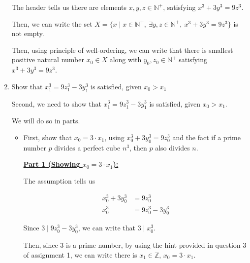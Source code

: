 \documentclass[12pt]{article}
\begin{document}
\begin{mdframed}
\begin{enumerate}[1.]
\begin{mdframed}
        \bigskip

        The header tells us there are elements $x,y,z \in \mathbb{N}^+$, satisfying
        $x^3 + 3y^3 = 9z^3$.

        \bigskip

        Then, we can write the set $X = \{x \mid x \in \mathbb{N}^+,\:\exists y,z \in
        \mathbb{N}^+,\:x^3 + 3y^3 = 9z^3\}$ is not empty.

        \bigskip

        Then, using principle of well-ordering, we can write that there is smallest
        positive natural number $x_0 \in X$ along with $y_0,z_0 \in \mathbb{N}^+$ satisfying
        $x^3 + 3y^3 = 9z^3$.
        \end{mdframed}

        \item Show that $x_1^3 = 9z_1^3 - 3y_1^3$ is satisfied, given $x_0 > x_1$

        \bigskip

        Second, we need to show that $x_1^3 = 9z_1^3 - 3y_1^3$ is satisfied, given
        $x_0 > x_1$.

        \bigskip

        We will do so in parts.

        \bigskip

        \begin{itemize}
            \item First, show that $x_0 = 3 \cdot x_1$, using $x_0^3 + 3y_0^3 = 9z_0^3$ and the
            fact if a prime number $p$ divides a perfect cube $n^3$, then $p$ also divides $n$.

            \begin{mdframed}
            \underline{\textbf{Part 1 (Showing $x_0 = 3 \cdot x_1$):}}

            \bigskip

            The assumption tells us

            \begin{align}
                x_0^3 + 3y_0^3 &= 9z_0^3\\
                x_0^3 &= 9z_0^3 - 3y_0^3
            \end{align}

            \bigskip

            Since $3 \mid 9z_0^3 - 3y_0^3$, we can write that $3 \mid x_0^3$.

            \bigskip

            Then, since 3 is a prime number, by using the hint provided in question 3
            of assignment 1, we can write there is $x_1 \in \mathbb{Z}$, $x_0 = 3 \cdot x_1$.


\end{mdframed}
\end{itemize}
\end{enumerate}
\end{mdframed}
\end{document}

